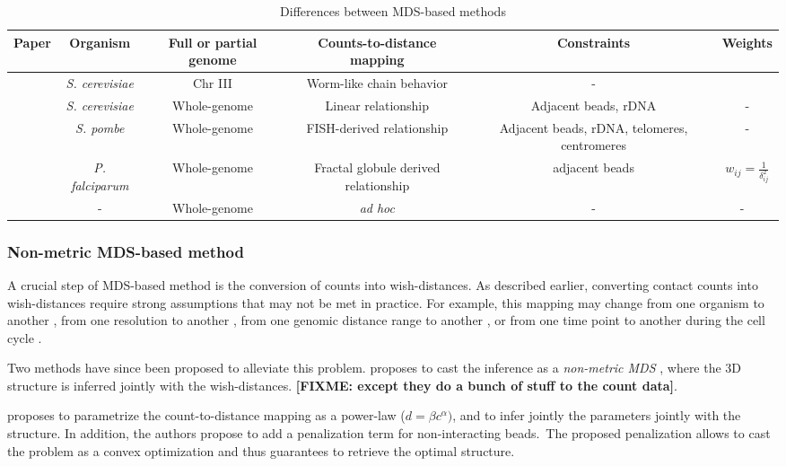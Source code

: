 \documentclass[letterpaper,12pt]{article}
\newcommand{\fixme}[1]{\textbf{[FIXME: #1]}}
\begin{document}
\begin{table*}
\scriptsize
\centering
\begin{tabular}{cccccc}
\hline
\textbf{Paper} & Organism & Full or partial genome & Counts-to-distance mapping & \textbf{Constraints}
& \textbf{Weights}\\
\hline
\cite{dekker:capturing} & {\em S. cerevisiae} & Chr III & Worm-like chain behavior & - \\
\cite{duan:three-dimensional} & {\em S. cerevisiae} & Whole-genome & Linear
relationship & Adjacent beads, rDNA & - \\
\cite{tanizawa:mapping} & {\em S. pombe} & Whole-genome &
FISH-derived relationship & Adjacent beads, rDNA, telomeres, centromeres & - \\
\cite{ay:three-dimensional} & {\em P. falciparum} & Whole-genome & Fractal
globule derived relationship & adjacent
beads & $w_{ij} = \frac{1}{\delta_{ij}^2}$ \\
\cite{lesne:3d} & - & Whole-genome & \textit{ad hoc} & - & - \
\end{tabular}
\caption{Differences between MDS-based methods}{}
\label{table:mds_detail}
\end{table*}


\subsubsection*{Non-metric MDS-based method}

A crucial step of MDS-based method is the conversion of counts into
wish-distances. As described earlier, converting contact counts into
wish-distances require strong assumptions that may not be met in practice. For
example, this mapping may change from one organism to another
\citep{fudenberg:higher-order}, from one resolution to another
\citep{zhang:inference}, from one genomic distance range to another
\citep{ay:statistical}, or from one time point to another during the cell
cycle \citep{le:high-resolution, ay:three-dimensional}.

Two methods have since been proposed to alleviate this problem.
\citet{ben-elazar:spatial} proposes to cast the inference as a
\emph{non-metric MDS} \citep{kruskal:multidimensional}, where the 3D structure
is inferred jointly with the wish-distances. \fixme{except they do a bunch of
stuff to the count data}.

\citet{zhang:inference} proposes to parametrize the count-to-distance mapping
as a power-law ($d = \beta c^\alpha)$, and to infer jointly the parameters
jointly with the structure. In addition, the authors propose to add a
penalization term for non-interacting beads. The proposed penalization allows
to cast the problem as a convex optimization and thus guarantees to retrieve
the optimal structure.
\end{document}
